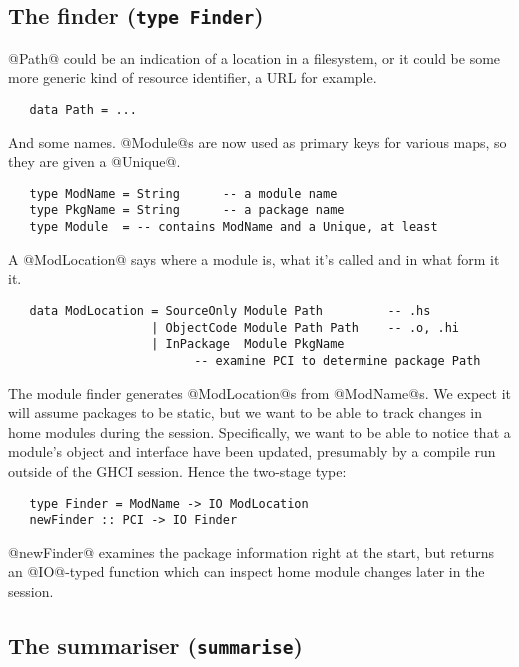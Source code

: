 \documentclass[11pt]{article}
\begin{document}
\subsection{The finder (\mbox{\tt type Finder})}
\label{sec:finder}

@Path@ could be an indication of a location in a filesystem, or it
could be some more generic kind of resource identifier, a URL for
example.
\begin{verbatim}
   data Path = ...
\end{verbatim}

And some names.  @Module@s are now used as primary keys for various
maps, so they are given a @Unique@.
\begin{verbatim}
   type ModName = String      -- a module name
   type PkgName = String      -- a package name
   type Module  = -- contains ModName and a Unique, at least
\end{verbatim}

A @ModLocation@ says where a module is, what it's called and in what
form it it.
\begin{verbatim}
   data ModLocation = SourceOnly Module Path         -- .hs
                    | ObjectCode Module Path Path    -- .o, .hi
                    | InPackage  Module PkgName
                          -- examine PCI to determine package Path
\end{verbatim}

The module finder generates @ModLocation@s from @ModName@s.  We expect
it will assume packages to be static, but we want to be able to track
changes in home modules during the session.  Specifically, we want to
be able to notice that a module's object and interface have been
updated, presumably by a compile run outside of the GHCI session.
Hence the two-stage type:
\begin{verbatim}
   type Finder = ModName -> IO ModLocation
   newFinder :: PCI -> IO Finder
\end{verbatim}
@newFinder@ examines the package information right at the start, but 
returns an @IO@-typed function which can inspect home module changes
later in the session.


\subsection{The summariser (\mbox{\tt summarise})}
\label{sec:summariser}
\end{document}
